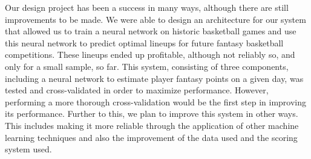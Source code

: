 Our design project has been a success in many ways, although there are still improvements to be made. We were able to design an architecture for our system that allowed us to train a neural network on historic basketball games and use this neural network to predict optimal lineups for future fantasy basketball competitions. These lineups ended up profitable, although not reliably so, and only for a small sample, so far. This system, consisting of three components, including a neural network to estimate player fantasy points on a given day, was tested and cross-validated in order to maximize performance. However, performing a more thorough cross-validation would be the first step in improving its performance. Further to this, we plan to improve this system in other ways. This includes making it more reliable through the application of other machine learning techniques and also the improvement of the data used and the scoring system used.